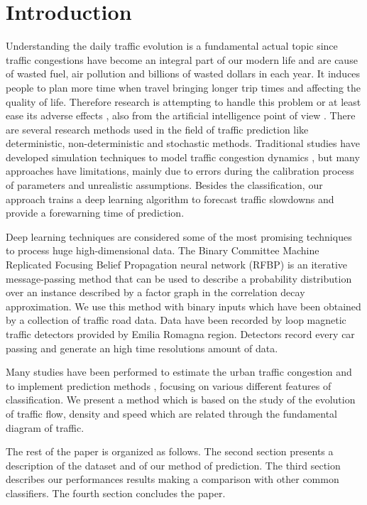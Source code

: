 \documentclass[a4paper,12pt]{article}
\begin{document}
\section{Introduction}
Understanding the daily traffic evolution is a fundamental actual topic since traffic congestions have become an integral part of our modern life and are cause of wasted fuel, air pollution and billions of wasted dollars in each year. It induces people to plan more time when travel bringing longer trip times and affecting the quality of life. Therefore research is attempting to handle this problem
or at least ease its adverse effects \cite{ZCW14,YB15}, also from the artificial intelligence point of view \cite{TG06, NT04, YR06, TMP07, SAB08}. There are several research methods used in the field of traffic prediction like deterministic, non-deterministic and stochastic \cite{C03} methods. Traditional studies have developed simulation techniques to model traffic congestion dynamics \cite{K13}, but many approaches have limitations, mainly due to errors during the calibration process of parameters and unrealistic assumptions. Besides the classification, our approach trains a deep learning algorithm to forecast traffic slowdowns and provide a forewarning time of prediction. 

Deep learning techniques \cite{NC11} are considered some of the most promising techniques to process huge high-dimensional data. The Binary Committee Machine Replicated Focusing Belief Propagation neural network (RFBP) is an iterative message-passing method that can be used to
describe a probability distribution over an instance described by a factor graph in the correlation decay approximation. We use this method with binary inputs which have been obtained by a collection of traffic road data. Data have been recorded by loop magnetic traffic detectors provided by Emilia Romagna region. Detectors record every car passing and generate an high time resolutions amount of data.

Many studies have been performed to estimate the urban traffic congestion and to implement prediction methods \cite{VKG14,HA15,ER15,DXSZ15,YDL15, CHW11, LYHVS11, PWM08}, focusing on various different features of classification. We present a method which is based on the study of the evolution of traffic flow, density and speed which are related through the fundamental diagram of traffic.  

The rest of the paper is organized as follows. The second section presents a description of the dataset and of our method of prediction. The third section describes our performances results making a comparison with other common classifiers. The fourth section concludes the paper.
\end{document}
